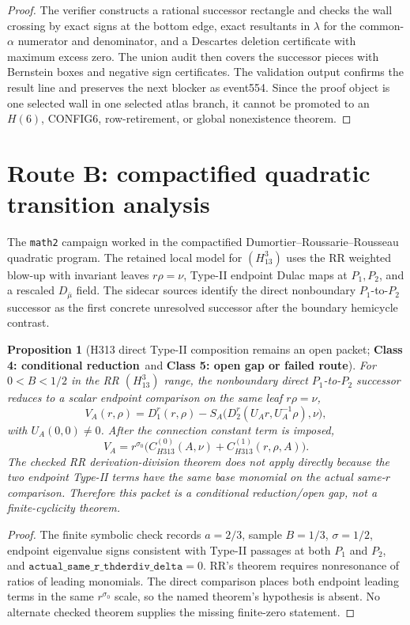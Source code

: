 \documentclass[11pt]{article}
\newtheorem{proposition}{Proposition}
\newcommand{\classfour}{\textbf{Class 4: conditional reduction}}
\newcommand{\classfive}{\textbf{Class 5: open gap or failed route}}
\begin{document}
\begin{proof}
The verifier constructs a rational successor rectangle and checks the wall crossing by exact signs at the bottom edge, exact resultants in \(\lambda\) for the common-\(\alpha\) numerator and denominator, and a Descartes deletion certificate with maximum excess zero.  The union audit then covers the successor pieces with Bernstein boxes and negative sign certificates.  The validation output confirms the result line and preserves the next blocker as event554.  Since the proof object is one selected wall in one selected atlas branch, it cannot be promoted to an \(H(6)\), CONFIG6, row-retirement, or global nonexistence theorem.
\end{proof}

\section{Route B: compactified quadratic transition analysis}
The \texttt{math2} campaign worked in the compactified Dumortier--Roussarie--Rousseau quadratic program.  The retained local model for \((H^3_{13})\) uses the RR weighted blow-up with invariant leaves \(r\rho=\nu\), Type-II endpoint Dulac maps at \(P_1,P_2\), and a rescaled \(D_{\bar\mu}\) field.  The sidecar sources identify the direct nonboundary \(P_1\)-to-\(P_2\) successor as the first concrete unresolved successor after the boundary hemicycle contrast.

\begin{proposition}[H313 direct Type-II composition remains an open packet; \classfour\ and \classfive]\label{prop:h313-direct}
For \(0<B<1/2\) in the RR \((H^3_{13})\) range, the nonboundary direct \(P_1\)-to-\(P_2\) successor reduces to a scalar endpoint comparison on the same leaf \(r\rho=\nu\),
\[
  V_A(r,\rho)=D^r_1(r,\rho)-
  S_A\bigl(D^r_2(U_A r,U_A^{-1}\rho),\nu\bigr),
\]
with \(U_A(0,0)\ne0\).  After the connection constant term is imposed,
\[
  V_A=r^{\sigma_0}\bigl(C_{H313}^{(0)}(A,\nu)+C_{H313}^{(1)}(r,\rho,A)\bigr).
\]
The checked RR derivation-division theorem does not apply directly because the two endpoint Type-II terms have the same base monomial on the actual same-\(r\) comparison.  Therefore this packet is a conditional reduction/open gap, not a finite-cyclicity theorem.
\end{proposition}

\begin{proof}
The finite symbolic check records \(a=2/3\), sample \(B=1/3\), \(\sigma=1/2\), endpoint eigenvalue signs consistent with Type-II passages at both \(P_1\) and \(P_2\), and \(\texttt{actual\_same\_r\_thderdiv\_delta}=0\).  RR's theorem requires nonresonance of ratios of leading monomials.  The direct comparison places both endpoint leading terms in the same \(r^{\sigma_0}\) scale, so the named theorem's hypothesis is absent.  No alternate checked theorem supplies the missing finite-zero statement.
\end{proof}
\end{document}
